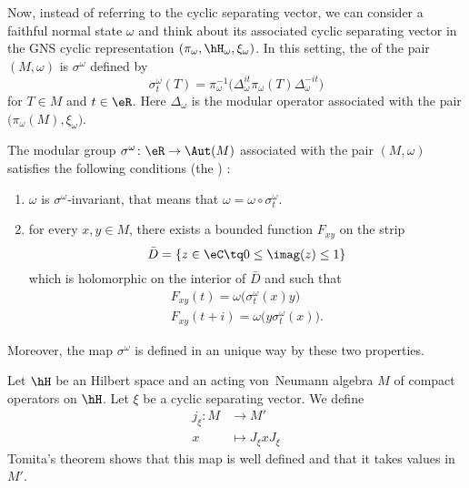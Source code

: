 Now, instead of referring to the cyclic separating vector, we can consider a faithful normal state $\omega$ and think about its associated cyclic separating vector in the GNS cyclic representation $(\pi_{\omega},\hH_{\omega},\xi_{\omega})$. In this setting, the  of the pair $(M,\omega)$ is $\sigma^{\omega}$ defined by
\begin{equation}
	\sigma_t^{\omega}(T)=\pi_{\omega}^{-1}\big( \Delta_{\omega}^{it}\pi_{\omega}(T)\Delta_{\omega}^{-it} \big)
\end{equation}
for $T\in M$ and $t\in\eR$. Here $\Delta_{\omega}$ is the modular operator associated with the pair $\big( \pi_{\omega}(M),\xi_{\omega} \big)$.

\begin{theorem}
	The modular group $\sigma^{\omega}\colon \eR\to \Aut(M)$ associated with the pair $(M,\omega)$ satisfies the following conditions (the ) :
	\begin{enumerate}
		\item
			$\omega$ is $\sigma^{\omega}$-invariant, that means that $\omega=\omega\circ\sigma_t^{\omega}$.
		\item
			for every $x,y\in M$, there exists a bounded function $F_{xy}$ on the strip
			\begin{equation}
				\bar D=\{ z\in\eC\tq 0\leq\imag(z)\leq 1 \}
			\end{equation}
			which is holomorphic on the interior of $\bar D$ and such that
			\begin{subequations}
				\begin{align}
					F_{xy}(t)=\omega\big( \sigma^{\omega}_t(x)y \big)\\
					F_{xy}(t+i)=\omega\big(y \sigma^{\omega}_t(x) \big).
				\end{align}
			\end{subequations}
			
	\end{enumerate}
	Moreover, the map $\sigma^{\omega}$ is defined in an unique way by these two properties.
\end{theorem}

Let $\hH$ be an Hilbert space and an acting von~Neumann algebra $M$ of compact operators on $\hH$. Let $\xi$ be a cyclic separating vector. We define
\begin{equation}
	\begin{aligned}
		j_{\xi}\colon M&\to M' \\
		x&\mapsto J_{\xi}xJ_{\xi} 
	\end{aligned}
\end{equation}
Tomita's theorem shows that this map is well defined and that it takes values in $M'$.

